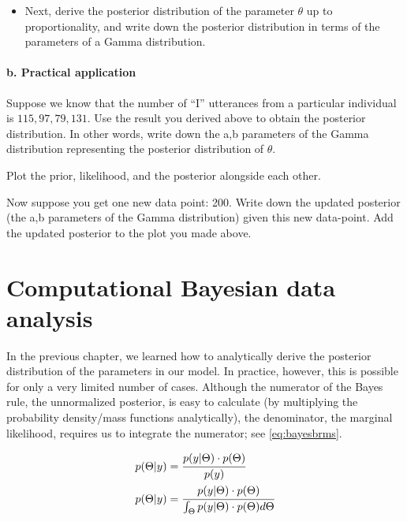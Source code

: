 \documentclass[12pt,]{krantz}
\providecommand{\tightlist}{%
  \setlength{\itemsep}{0pt}\setlength{\parskip}{0pt}}
\theoremstyle{definition}
\theoremstyle{definition}
\theoremstyle{definition}
\theoremstyle{remark}
\begin{document}
\begin{itemize}
\tightlist
\item
  Next, derive the posterior distribution of the parameter \(\theta\) up to proportionality, and write down the posterior distribution in terms of the parameters of a Gamma distribution.
\end{itemize}

\hypertarget{b.-practical-application}{%
\subsubsection{b. Practical application}\label{b.-practical-application}}

Suppose we know that the number of ``I'' utterances from a particular individual is \(115, 97, 79, 131\). Use the result you derived above to obtain the posterior distribution. In other words, write down the a,b parameters of the Gamma distribution representing the posterior distribution of \(\theta\).

Plot the prior, likelihood, and the posterior alongside each other.

Now suppose you get one new data point: 200. Write down the updated posterior (the a,b parameters of the Gamma distribution) given this new data-point. Add the updated posterior to the plot you made above.

\hypertarget{computational-bayesian-data-analysis}{%
\chapter{Computational Bayesian data analysis}\label{computational-bayesian-data-analysis}}

In the previous chapter, we learned how to analytically derive the posterior distribution of the parameters in our model.
In practice, however, this is possible for only a very limited number of cases. Although the numerator of the Bayes rule, the unnormalized posterior, is easy to calculate (by multiplying the probability density/mass functions analytically), the denominator, the marginal likelihood, requires us to integrate the numerator; see \eqref{eq:bayesbrms}.

\begin{equation}
\begin{aligned}
p(\Theta|y) &= \cfrac{ p(y|\Theta) \cdot p(\Theta) }{p(y)}\\
p(\Theta|y) &= \cfrac{ p(y|\Theta) \cdot p(\Theta) }{\int_{\Theta} p(y|\Theta) \cdot p(\Theta) d\Theta }
\end{aligned}
\label{eq:bayesbrms}
\end{equation}
\end{document}
